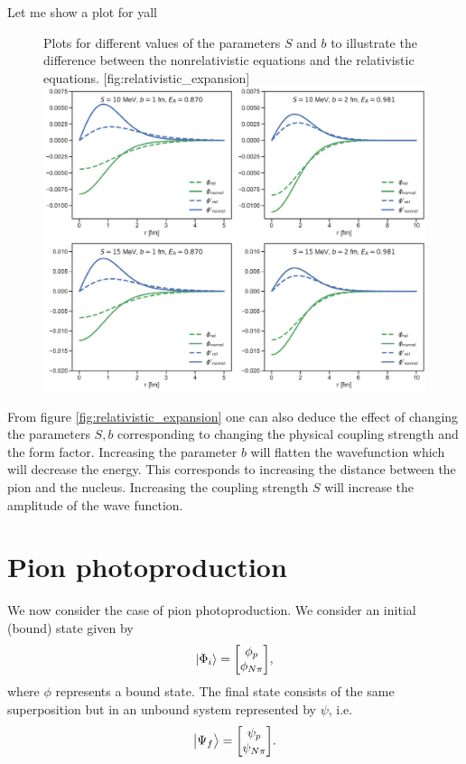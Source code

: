 Let me show a plot for yall
\begin{figure}[H]
    \begin{sidecaption}{Plots for different values of the parameters $S$ and $b$ to illustrate the difference between the nonrelativistic equations and the relativistic equations. }[fig:relativistic_expansion]
    \includegraphics[width=\linewidth]{Figures/RelativisticExpansion.pdf}
    \end{sidecaption}
\end{figure}
From figure \ref{fig:relativistic_expansion} one can also deduce the effect of changing the parameters $S,b$ corresponding to changing the physical coupling strength and the form factor. Increasing the parameter $b$ will flatten the wavefunction which will decrease the energy. This corresponds to increasing the distance between the pion and the nucleus. Increasing the coupling strength $S$ will increase the amplitude of the wave function.
\section{Pion photoproduction}\label{sec:dipoleapprox}
We now consider the case of pion photoproduction. We consider an initial (bound) state given by
\begin{equation} \label{phii}
    \ket{\Phi_i} = \mqty[\phi_p \\ \phi_{N\pi}],
\end{equation}
where $\phi$ represents a bound state. The final state consists of the same superposition but in an unbound system represented by $\psi$, i.e.
\begin{equation} \label{psif}
    \ket{\Psi_f} = \mqty[\psi_p \\ \psi_{N\pi}].
\end{equation}
